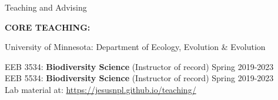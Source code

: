 \documentclass{resume} %
\begin{document}



\begin{rSection}{Teaching and Advising}

\textbf{CORE TEACHING:}

\normalfont 

\begin{reSubsection}{University of Minnesota: }{Department of Ecology, Evolution \& Evolution }{}{
EEB 3534: \textbf{Biodiversity Science} (Instructor of record) \hfill Spring 2019-2023 \\ 
EEB 5534: \textbf{Biodiversity Science} (Instructor of record) \hfill Spring 2019-2023 \\ 
{Lab material at:
\url{https://jesusnpl.github.io/teaching/}} \smallskip



 
}
\end{reSubsection}
\end{rSection}
\end{document}
